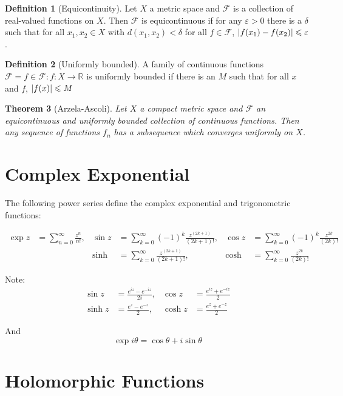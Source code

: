 \documentclass[11pt,a4paper, titlepage]{article}
\newtheorem{theorem}{Theorem}[section]
\DeclarePairedDelimiter\abs{\lvert}{\rvert}
\theoremstyle{definition}
\newtheorem{definition}[theorem]{Definition}
\begin{document}
\begin{definition}[Equicontinuity]
Let $X$ a metric space and $\mathcal{F}$ is a collection of real-valued functions on $X$. Then $\mathcal{F}$ is equicontinuous if for any $\varepsilon > 0$ there is a $\delta$ such that for all $x_1, x_2 \in X$ with $d(x_1,x_2) < \delta$ for all $f \in \mathcal{F}$, $\abs{f(x_1) - f(x_2)} \leqslant \varepsilon$. 
\end{definition}

\begin{definition}[Uniformly bounded]
A family of continuous  functions $\mathcal{F} = {f \in \mathcal{F} \colon f \colon X \longrightarrow \mathbb{R}}$ is uniformly bounded if there is an $M$ such that for all $x$ and $f$, $\abs{f(x)} \leqslant M$
\end{definition}

\begin{theorem}[Arzela-Ascoli]
Let $X$ a compact metric space and $\mathcal{F}$ an equicontinuous and uniformly bounded collection of continuous functions. Then any sequence of functions $f_n$ has a subsequence which converges uniformly on $X$.
\end{theorem}
\section{Complex Exponential}

The following power series define the complex exponential and trigonometric functions:

\begin{align*}
	\exp z &= \sum_{n = 0}^\infty \frac{z^n}{n!}, & \sin z &= \sum_{k = 0}^\infty (-1)^k\frac{z^{(2k+1)}}{(2k + 1)!},& \cos z &= \sum_{k = 0}^\infty (-1)^k\frac{z^{2k}}{(2k)!} \\
 	&& \sinh &= \sum_{k = 0}^\infty \frac{z^{(2k+1)}}{(2k + 1)!}, &\cosh &= \sum_{k = 0}^\infty \frac{z^{2k}}{(2k)!}
\end{align*}

Note:
\begin{align*}
\sin z &= \frac{e^{iz} - e^{-iz}}{2i}, & \cos z &= \frac{e^{iz} + e^{-iz}}{2} \\
\sinh z &= \frac{e^{z} - e^{-z}}{2}, & \cosh z &= \frac{e^{z} + e^{-z}}{2}
\end{align*}

And
\[
	\exp i \theta = \cos \theta + i \sin \theta
\]
	


\section{Holomorphic Functions}
\end{document}
